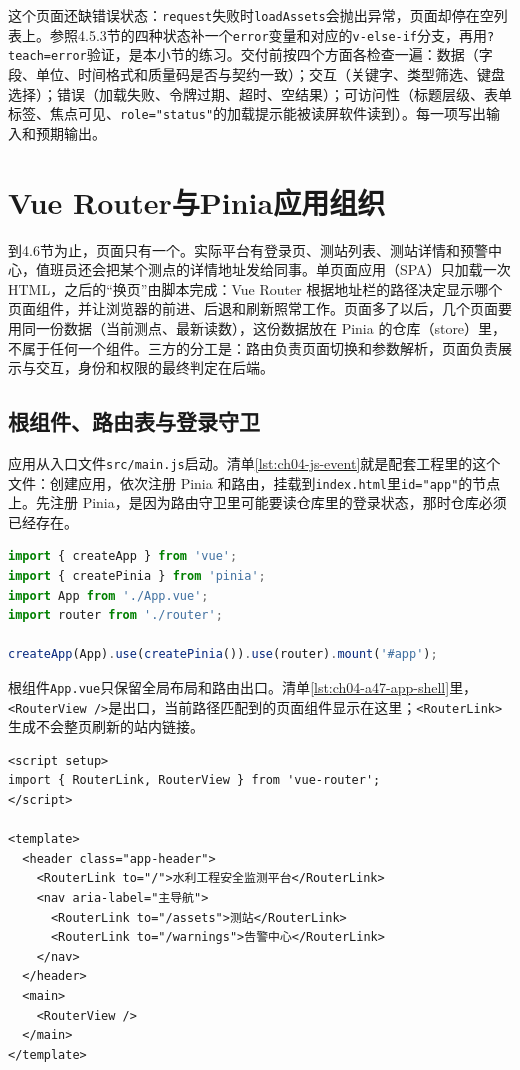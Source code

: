这个页面还缺错误状态：\texttt{request}失败时\texttt{loadAssets}会抛出异常，页面却停在空列表上。参照4.5.3节的四种状态补一个\texttt{error}变量和对应的\texttt{v-else-if}分支，再用\texttt{?teach=error}验证，是本小节的练习。交付前按四个方面各检查一遍：数据（字段、单位、时间格式和质量码是否与契约一致）；交互（关键字、类型筛选、键盘选择）；错误（加载失败、令牌过期、超时、空结果）；可访问性（标题层级、表单标签、焦点可见、\texttt{role="status"}的加载提示能被读屏软件读到）。每一项写出输入和预期输出。

\section{Vue Router与Pinia应用组织}


到4.6节为止，页面只有一个。实际平台有登录页、测站列表、测站详情和预警中心，值班员还会把某个测点的详情地址发给同事。单页面应用（SPA）只加载一次HTML，之后的“换页”由脚本完成：Vue Router 根据地址栏的路径决定显示哪个页面组件，并让浏览器的前进、后退和刷新照常工作。页面多了以后，几个页面要用同一份数据（当前测点、最新读数），这份数据放在 Pinia 的仓库（store）里，不属于任何一个组件。三方的分工是：路由负责页面切换和参数解析，页面负责展示与交互，身份和权限的最终判定在后端。

\subsection{根组件、路由表与登录守卫}

应用从入口文件\texttt{src/main.js}启动。清单\ref{lst:ch04-js-event}就是配套工程里的这个文件：创建应用，依次注册 Pinia 和路由，挂载到\texttt{index.html}里\texttt{id="app"}的节点上。先注册 Pinia，是因为路由守卫里可能要读仓库里的登录状态，那时仓库必须已经存在。

\begin{lstlisting}[label={lst:ch04-js-event},language=JavaScript,caption={应用入口：注册 Pinia 与路由}]
import { createApp } from 'vue';
import { createPinia } from 'pinia';
import App from './App.vue';
import router from './router';

createApp(App).use(createPinia()).use(router).mount('#app');
\end{lstlisting}

根组件\texttt{App.vue}只保留全局布局和路由出口。清单\ref{lst:ch04-a47-app-shell}里，\texttt{<RouterView />}是出口，当前路径匹配到的页面组件显示在这里；\texttt{<RouterLink>}生成不会整页刷新的站内链接。

\begin{lstlisting}[label={lst:ch04-a47-app-shell},language=Vue,caption={App.vue 根组件与 router-view}]
<script setup>
import { RouterLink, RouterView } from 'vue-router';
</script>

<template>
  <header class="app-header">
    <RouterLink to="/">水利工程安全监测平台</RouterLink>
    <nav aria-label="主导航">
      <RouterLink to="/assets">测站</RouterLink>
      <RouterLink to="/warnings">告警中心</RouterLink>
    </nav>
  </header>
  <main>
    <RouterView />
  </main>
</template>
\end{lstlisting}

